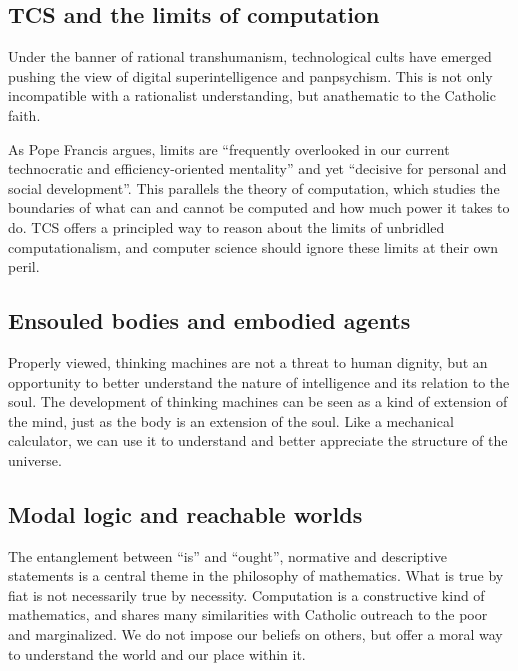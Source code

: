 \documentclass[sigplan,nonacm]{acmart}\settopmatter{printfolios=false,printccs=false,printacmref=false}
\begin{document}
  \subsection{TCS and the limits of computation}

  Under the banner of rational transhumanism, technological cults have emerged pushing the view of digital superintelligence and panpsychism. This is not only incompatible with a rationalist understanding, but anathematic to the Catholic faith.

  As Pope Francis argues, limits are ``frequently overlooked in our current technocratic and efficiency-oriented mentality'' and yet ``decisive for personal and social development''. This parallels the theory of computation, which studies the boundaries of what can and cannot be computed and how much power it takes to do. TCS offers a principled way to reason about the limits of unbridled computationalism, and computer science should ignore these limits at their own peril.


  \subsection{Ensouled bodies and embodied agents}

  Properly viewed, thinking machines are not a threat to human dignity, but an opportunity to better understand the nature of intelligence and its relation to the soul. The development of thinking machines can be seen as a kind of extension of the mind, just as the body is an extension of the soul. Like a mechanical calculator, we can use it to understand and better appreciate the structure of the universe.

  \subsection{Modal logic and reachable worlds}

  The entanglement between ``is'' and ``ought'', normative and descriptive statements is a central theme in the philosophy of mathematics. What is true by fiat is not necessarily true by necessity. Computation is a constructive kind of mathematics, and shares many similarities with Catholic outreach to the poor and marginalized. We do not impose our beliefs on others, but offer a moral way to understand the world and our place within it.
\end{document}
